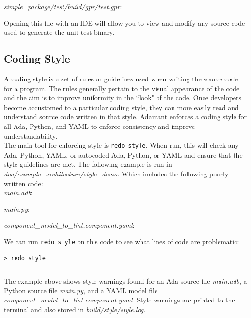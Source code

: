 \textit{simple\_package/test/build/gpr/test.gpr}:

Opening this file with an IDE will allow you to view and modify any source code used to generate the unit test binary.

\subsection{Coding Style} \label{Coding Style}

A coding style is a set of rules or guidelines used when writing the source code for a program. The rules generally pertain to the visual appearance of the code and the aim is to improve uniformity in the ``look" of the code. Once developers become accustomed to a particular coding style, they can more easily read and understand source code written in that style. Adamant enforces a coding style for all Ada, Python, and YAML to enforce consistency and improve understandability. \\

The main tool for enforcing style is \texttt{redo style}. When run, this will check any Ada, Python, YAML, or autocoded Ada, Python, or YAML and ensure that the style guidelines are met. The following example is run in \textit{doc/example\_architecture/style\_demo}. Which includes the following poorly written code: \\

\textit{main.adb}:

\textit{main.py}:

\textit{component\_model\_to\_lint.component.yaml}:

We can run \texttt{redo style} on this code to see what lines of code are problematic:

\vspace{5mm} %
\begin{verbatim}
> redo style
\end{verbatim}
\inputminted{text}{../example_architecture/style_demo/build/style/style.log}
\vspace{5mm} %

The example above shows style warnings found for an Ada source file \textit{main.adb}, a Python source file \textit{main.py}, and a YAML model file \textit{component\_model\_to\_lint.component.yaml}. Style warnings are printed to the terminal and also stored in \textit{build/style/style.log}. \\

